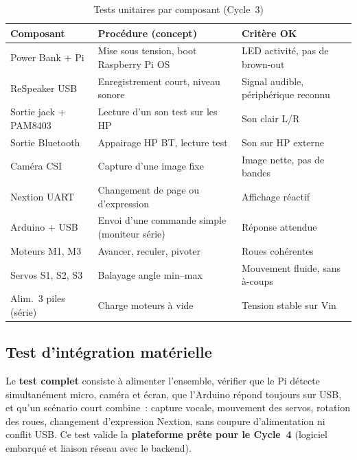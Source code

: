 \documentclass[a4paper,12pt]{report}
\begin{document}
	\begin{table}[htbp]
		\centering
		\caption{Tests unitaires par composant (Cycle~3)}
		\label{tab:tests_unitaires_cycle3}
		\renewcommand{\arraystretch}{1.35}
		\small
		\begin{tabularx}{\textwidth}{|>{\raggedright\arraybackslash}p{2.6cm}|>{\raggedright\arraybackslash}X|>{\raggedright\arraybackslash}p{3.2cm}|}
			\hline
			\textbf{Composant} & \textbf{Procédure (concept)} & \textbf{Critère OK} \\
			\hline
			Power Bank + Pi & Mise sous tension, boot Raspberry Pi OS &
			LED activité, pas de brown-out \\
			\hline
			ReSpeaker USB & Enregistrement court, niveau sonore &
			Signal audible, périphérique reconnu \\
			\hline
			Sortie jack + PAM8403 & Lecture d'un son test sur les HP &
			Son clair L/R \\
			\hline
			Sortie Bluetooth & Appairage HP BT, lecture test &
			Son sur HP externe \\
			\hline
			Caméra CSI & Capture d'une image fixe &
			Image nette, pas de bandes \\
			\hline
			Nextion UART & Changement de page ou d'expression &
			Affichage réactif \\
			\hline
			Arduino + USB & Envoi d'une commande simple (moniteur série) &
			Réponse attendue \\
			\hline
			Moteurs M1, M3 & Avancer, reculer, pivoter &
			Roues cohérentes \\
			\hline
			Servos S1, S2, S3 & Balayage angle min--max &
			Mouvement fluide, sans à-coups \\
			\hline
			Alim.\ 3 piles (série) & Charge moteurs à vide &
			Tension stable sur Vin \\
			\hline
		\end{tabularx}
		\normalsize
	\end{table}
	
	\subsection{Test d'intégration matérielle}
	
	Le \textbf{test complet} consiste à alimenter l'ensemble, vérifier que le Pi
	détecte simultanément micro, caméra et écran, que l'Arduino répond toujours
	sur USB, et qu'un scénario court combine~: capture vocale, mouvement des
	servos, rotation des roues, changement d'expression Nextion, sans coupure
	d'alimentation ni conflit USB. Ce test valide la \textbf{plateforme prête
	pour le Cycle~4} (logiciel embarqué et liaison réseau avec le backend).
	
\end{document}
